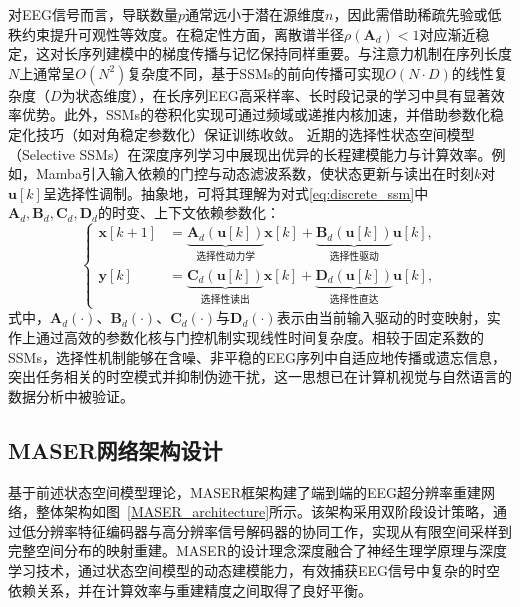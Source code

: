 对EEG信号而言，导联数量$p$通常远小于潜在源维度$n$，因此需借助稀疏先验或低秩约束提升可观性等效度\cite{friston2008multiple}。在稳定性方面，离散谱半径$\rho(\mathbf{A}_d)<1$对应渐近稳定，这对长序列建模中的梯度传播与记忆保持同样重要\cite{gu2021efficiently}。与注意力机制在序列长度$N$上通常呈$O(N^{2})$复杂度不同，基于SSMs的前向传播可实现$O(N\cdot D)$的线性复杂度（$D$为状态维度），在长序列EEG高采样率、长时段记录的学习中具有显著效率优势\cite{gu2021efficiently, gupta2022diagonal}。此外，SSMs的卷积化实现可通过频域或递推内核加速，并借助参数化稳定化技巧（如对角稳定参数化）保证训练收敛\cite{gu2022parameterization}。
近期的选择性状态空间模型（Selective SSMs）在深度序列学习中展现出优异的长程建模能力与计算效率。例如，Mamba引入输入依赖的门控与动态滤波系数，使状态更新与读出在时刻$k$对$\mathbf{u}[k]$呈选择性调制\cite{gu2023mamba}。抽象地，可将其理解为对式\eqref{eq:discrete_ssm}中$\mathbf{A}_d,\mathbf{B}_d,\mathbf{C}_d,\mathbf{D}_d$的时变、上下文依赖参数化：
\begin{equation}
\left\{
\begin{aligned}
\mathbf{x}[k+1] &= \underbrace{\mathbf{A}_d(\mathbf{u}[k])}_{\text{选择性动力学}}\mathbf{x}[k] + \underbrace{\mathbf{B}_d(\mathbf{u}[k])}_{\text{选择性驱动}}\mathbf{u}[k], \\
\mathbf{y}[k] &= \underbrace{\mathbf{C}_d(\mathbf{u}[k])}_{\text{选择性读出}}\mathbf{x}[k] + \underbrace{\mathbf{D}_d(\mathbf{u}[k])}_{\text{选择性直达}}\mathbf{u}[k],
\end{aligned}
\right.
\label{eq:selective_ssm}
\end{equation}
式中，$\mathbf{A}_d(\cdot)$、$\mathbf{B}_d(\cdot)$、$\mathbf{C}_d(\cdot)$与$\mathbf{D}_d(\cdot)$表示由当前输入驱动的时变映射，实作上通过高效的参数化核与门控机制实现线性时间复杂度\cite{gu2023mamba, ali2024hidden, xu2024survey}。相较于固定系数的SSMs，选择性机制能够在含噪、非平稳的EEG序列中自适应地传播或遗忘信息，突出任务相关的时空模式并抑制伪迹干扰，这一思想已在计算机视觉与自然语言的数据分析中被验证\cite{liu2024vmamba, zhu2024vision, li2024mamba}。

\subsection{MASER网络架构设计}
基于前述状态空间模型理论，MASER框架构建了端到端的EEG超分辨率重建网络，整体架构如图~\ref{MASER_architecture}所示。该架构采用双阶段设计策略，通过低分辨率特征编码器与高分辨率信号解码器的协同工作，实现从有限空间采样到完整空间分布的映射重建。MASER的设计理念深度融合了神经生理学原理与深度学习技术，通过状态空间模型的动态建模能力，有效捕获EEG信号中复杂的时空依赖关系，并在计算效率与重建精度之间取得了良好平衡。


